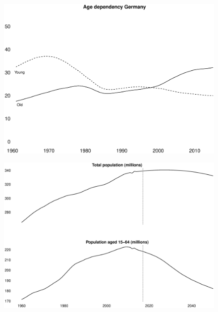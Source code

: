 \documentclass{beamer}
\begin{document}
\begin{frame}
  \begin{figure}
    \includegraphics[scale=.3]{age_ger.eps}
  \end{figure}
\end{frame}

\begin{frame}
  \begin{figure}
    \includegraphics[scale=.3]{population_projection.eps}
  \end{figure}
\end{frame}
\end{document}
